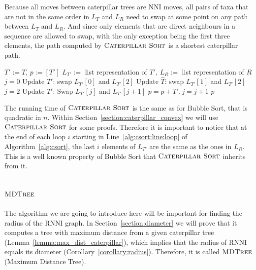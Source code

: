 \documentclass{amsart}
\newcommand{\nni}{\mathrm{NNI}}
\newcommand{\rnni}{\mathrm{RNNI}}
\newcommand{\csort}{\textsc{Caterpillar Sort}}
\newcommand{\mdtree}{\textsc{MDTree}}
\begin{document}
Because all moves between caterpillar trees are $\nni$ moves, all pairs of taxa that are not in the same order in $L_T$ and $L_R$ need to swap at some point on any path between $L_T$ and $L_R$.
And since only elements that are direct neighbours in a sequence are allowed to swap, with the only exception being the first three elements, the path computed by $\csort$ is a shortest caterpillar path.

\begin{algorithm}[H]
\caption{$\csort$($T,R$)}
\label{alg:csort}
\begin{algorithmic}[1]
\STATE $T':= T$, $p := [T']$
\STATE $L_{T'}:=$ list representation of $T'$, $L_R:=$ list representation of $R$
 \label{alg:csort:line:loop}
\STATE $j = 0$ 
\STATE Update $T'$: swap $L_{T'}[0]$ and $L_{T'}[2]$
\STATE Update $\hat T$: swap $L_{T'}[1]$ and $L_{T'}[2]$
\ENDIF
\STATE $j = 2$
\STATE Update $T'$: Swap $L_{T'}[j]$ and $L_{T'}[j+1]$
\STATE $p = p+T', j = j + 1$
\ENDWHILE
\ENDFOR
\RETURN $p$
\end{algorithmic}
\end{algorithm}

The running time of $\csort$ is the same as for Bubble Sort, that is quadratic in $n$.
Within Section~\ref{section:caterpillar_convex} we will use $\csort$ for some proofs.
Therefore it is important to notice that at the end of each loop $i$ starting in Line~\ref{alg:csort:line:loop} of Algorithm~\ref{alg:csort}, the last $i$ elements of $L_{T'}$ are the same as the ones in $L_R$.
This is a well known property of Bubble Sort that $\csort$ inherits from it.


\subsection{$\mdtree$}
\label{section:alg_mdtree}

The algorithm we are going to introduce here will be important for finding the radius of the $\rnni$ graph.
In Section~\ref{section:diameter} we will prove that it computes a tree with maximum distance from a given caterpillar tree (Lemma~\ref{lemma:max_dist_caterpillar}), which implies that the radius of $\rnni$ equals its diameter (Corollary~\ref{corollary:radius}).
Therefore, it is called $\mdtree$ (Maximum Distance Tree).
\end{document}
